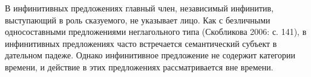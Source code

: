 В инфинитивных предложениях главный член, независимый инфинитив, выступающий в роль сказуемого, не указывает лицо. Как с безличными односоставными предложениями неглагольного типа (Скобликова 2006: с. 141), в инфинитивных предложениях часто встречается семантический субъект в дательном падеже. Однако инфинитивное предложение не содержит категории времени, и действие в этих предложениях рассматривается вне времени.


%
%
%

